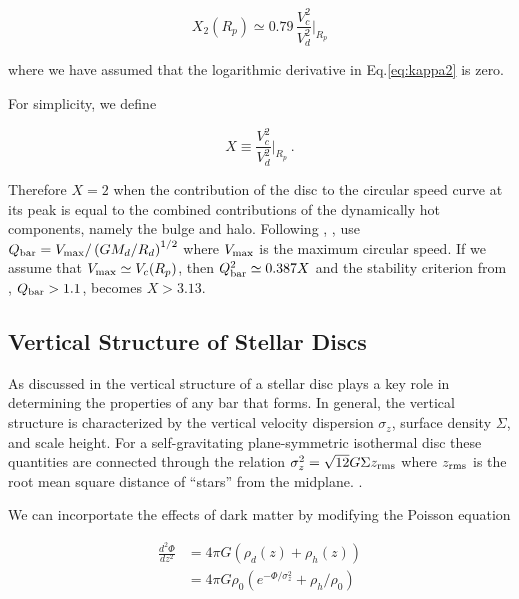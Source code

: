 \begin{equation} \label{eq:x2}
X_2(R_p) \simeq  0.79\,\frac{V_c^2}{V_d^2}\Biggr\rvert_{R_p}
\end{equation}

\noindent where we have assumed that the logarithmic derivative in
Eq.\eqref{eq:kappa2} is zero.

For simplicity, we define

\begin{equation} \label{eq:x}
X \equiv  \frac{V_c^2}{V_d^2}\Biggr\rvert_{R_p}~.
\end{equation}

\noindent Therefore $X=2$ when the contribution of the disc to the
circular speed curve at its peak is equal to the combined
contributions of the dynamically hot components, namely the bulge and
halo.  Following \citet{EfstathiouShotNoise},
\citet{YurinSpringelStellarDisks}, use $Q_{\rm bar} = V_{\rm
  max}/\left (GM_d/R_d\right )^{1/2}$ where $V_{\rm max}$ is the
maximum circular speed.  If we assume that $V_{\rm max}\simeq
V_c(R_p)$, then $Q_{\rm bar}^2 \simeq 0.387 X$ and the stability
criterion from \citet{EfstathiouShotNoise}, $Q_{\rm bar}>1.1$, becomes
$X > 3.13$.

\subsection{Vertical Structure of Stellar Discs}

As discussed in \citet{Klypin2009} the vertical structure of a stellar
disc plays a key role in determining the properties of any bar that
forms.  In general, the vertical structure is characterized by the
vertical velocity dispersion $\sigma_z$, surface density $\Sigma$, and
scale height.  For a self-gravitating plane-symmetric isothermal disc
these quantities are connected through the relation $\sigma_z^2 =
\sqrt{12}G\Sigma z_{\rm rms}$ where $z_{\rm rms}$ is the root mean square distance
of ``stars'' from the midplane.  \citep{spitzer1942, camm1950}.

We can incorportate the effects of dark matter by modifying
the Poisson equation

\begin{equation} \label{eq:spitzerpoisson}
\begin{aligned}
\frac{d^2\Phi}{dz^2} & = 4\pi G \left (\rho_d(z) + \rho_h(z) \right )\\
& = 4\pi G\rho_0 \left(e^{-\Phi/\sigma_z^2} + \rho_h/\rho_0\right )
\end{aligned}
\end{equation}

